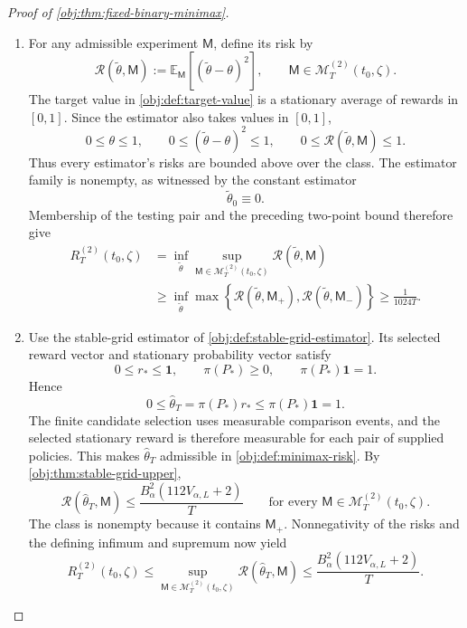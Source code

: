 \begin{proof}[Proof of \cref{obj:thm:fixed-binary-minimax}]
\begin{enumerate}
\item For any admissible experiment \(\mathsf M\), define its risk by
\[
\mathcal R(\widetilde\theta,\mathsf M)
:=
\mathbb E_{\mathsf M}[(\widetilde\theta-\theta)^2],
\qquad
\mathsf M\in\mathcal M_T^{(2)}(t_0,\zeta).
\]
The target value in \cref{obj:def:target-value} is a stationary average of rewards in \([0,1]\). Since the estimator also takes values in \([0,1]\),
\[
0\leq\theta\leq1,
\qquad
0\leq(\widetilde\theta-\theta)^2\leq1,
\qquad
0\leq\mathcal R(\widetilde\theta,\mathsf M)\leq1.
\]
Thus every estimator's risks are bounded above over the class. The estimator family is nonempty, as witnessed by the constant estimator
\[
\widetilde\theta_0\equiv0.
\]
Membership of the testing pair and the preceding two-point bound therefore give
\[
\begin{aligned}
R_T^{(2)}(t_0,\zeta)
&=\inf_{\widetilde\theta}
\sup_{\mathsf M\in\mathcal M_T^{(2)}(t_0,\zeta)}
\mathcal R(\widetilde\theta,\mathsf M)\\
&\geq
\inf_{\widetilde\theta}
\max\left\{
\mathcal R(\widetilde\theta,\mathsf M_+),
\mathcal R(\widetilde\theta,\mathsf M_-)
\right\}
\geq\frac1{1024T}.
\end{aligned}
\]

\item Use the stable-grid estimator of
\cref{obj:def:stable-grid-estimator}. Its selected reward vector and stationary probability vector satisfy
\[
0\leq r_*\leq\mathbf1,
\qquad
\pi(P_*)\geq0,
\qquad
\pi(P_*)\mathbf1=1.
\]
Hence
\[
0\leq\widehat\theta_T
=\pi(P_*)r_*
\leq\pi(P_*)\mathbf1=1.
\]
The finite candidate selection uses measurable comparison events, and the selected stationary reward is therefore measurable for each pair of supplied policies. This makes \(\widehat\theta_T\) admissible in
\cref{obj:def:minimax-risk}. By \cref{obj:thm:stable-grid-upper},
\[
\mathcal R(\widehat\theta_T,\mathsf M)
\leq\frac{B_\alpha^2(112V_{\alpha,L}+2)}{T}
\qquad
\text{for every }\mathsf M\in\mathcal M_T^{(2)}(t_0,\zeta).
\]
The class is nonempty because it contains \(\mathsf M_+\). Nonnegativity of the risks and the defining infimum and supremum now yield
\[
R_T^{(2)}(t_0,\zeta)
\leq
\sup_{\mathsf M\in\mathcal M_T^{(2)}(t_0,\zeta)}
\mathcal R(\widehat\theta_T,\mathsf M)
\leq\frac{B_\alpha^2(112V_{\alpha,L}+2)}{T}.
\]


\end{enumerate}
\end{proof}
